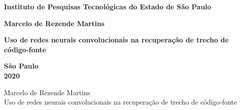 \documentclass[12pt,oneside,a4paper]{book} %
\begin{document}
\frontmatter 
\fancyhead[RO]{{\footnotesize\rightmark}\hspace{2em}\thepage}
\setcounter{tocdepth}{2}
\fancyhead[LE]{\thepage\hspace{2em}\footnotesize{\leftmark}}
\fancyhead[RE,LO]{}
\fancyhead[RO]{{\footnotesize\rightmark}\hspace{2em}\thepage}

\onehalfspacing  %

\thispagestyle{empty}
\begin{center}
    \large{\textbf{Instituto de Pesquisas Tecnológicas do Estado de São Paulo}}\\
    
    \vspace*{4cm}
    
    
    
    
    \large{\textbf{Marcelo de Rezende Martins}}
    
    \vspace*{6cm}
    
    \textbf{\large{Uso de redes neurais convolucionais na recuperação de trecho de código-fonte}}\\
    
    
    
   \vspace*{10cm}
   
    \large{\textbf{São Paulo}} \\
    \large{\textbf{2020}}
\end{center}

%
%
%
\newpage
\thispagestyle{empty}
    \begin{center}
        Marcelo de Rezende Martins\\
        \vspace*{2.3 cm}
        Uso de redes neurais convolucionais na recuperação de trecho de código-fonte\\
        \vspace*{2 cm}
    \end{center}
\end{document}
